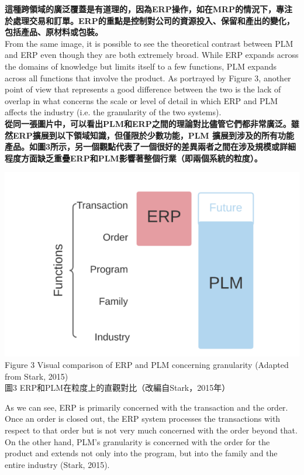 \documentclass[24pt]{article} %
\begin{document}
\textbf{這種跨領域的廣泛覆蓋是有道理的，因為ERP操作，如在MRP的情況下，專注於處理交易和訂單。ERP的重點是控制對公司的資源投入、保留和產出的變化，包括產品、原材料或包裝。}\\

From the same image, it is possible to see the theoretical contrast between PLM and ERP even though they are both extremely broad. While ERP expands across the domains of knowledge but limits itself to a few functions, PLM expands across all functions that involve the product. As portrayed by Figure 3, another point of view that represents a good difference between the two is the lack of overlap in what concerns the scale or level of detail in which ERP and PLM affects the industry (i.e. the granularity of the two systems).\\

\textbf{從同一張圖片中，可以看出PLM和ERP之間的理論對比儘管它們都非常廣泛。雖然ERP擴展到以下領域知識，但僅限於少數功能，PLM 擴展到涉及的所有功能產品。如圖3所示，另一個觀點代表了一個很好的差異兩者之間在涉及規模或詳細程度方面缺乏重疊ERP和PLM影響著整個行業（即兩個系統的粒度）。}\\

\begin{center}
\includegraphics[width=15cm]{3.png}\\

Figure 3 Visual comparison of ERP and PLM concerning granularity (Adapted from Stark, 2015) \\

圖3 ERP和PLM在粒度上的直觀對比（改編自Stark，2015年）\\

\end{center}

As we can see, ERP is primarily concerned with the transaction and the order. Once an order is closed out, the ERP system processes the transactions with respect to that order but is not very much concerned with the order beyond that. On the other hand, PLM’s granularity is concerned with the order for the product and extends not only into the program, but into the family and the entire industry (Stark, 2015).\\
\end{document}
